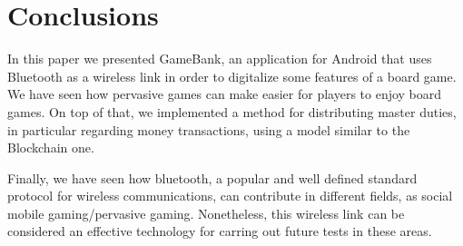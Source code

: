 \section*{Conclusions}
\label{conclusions}

In this paper we presented GameBank, an application for Android that uses 
Bluetooth as a wireless link in order to digitalize some features of a board 
game. We have seen how pervasive games can make easier for players to enjoy 
board games. On top of that, we implemented a method for distributing master 
duties, in particular regarding money transactions, using a model similar to 
the Blockchain one.

Finally, we have seen how bluetooth, a popular and well defined standard 
protocol for wireless communications, can contribute in different fields, as 
social mobile gaming/pervasive gaming. Nonetheless, this wireless link can be 
considered an effective technology for carring out future tests in these areas.
